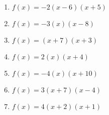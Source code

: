 \documentclass{article}%
\begin{document}
\begin{enumerate}[label=\alph*)]
\item%
\newline\vspace{0.5cm} $f(x)=-2(x-6)(x+5)$%
\item%
\newline\vspace{0.5cm} $f(x)=-3(x)(x-8)$%
\item%
\newline\vspace{0.5cm} $f(x)=(x+7)(x+3)$%
\item%
\newline\vspace{0.5cm} $f(x)=2(x)(x+4)$%
\item%
\newline\vspace{0.5cm} $f(x)=-4(x)(x+10)$%
\item%
\newline\vspace{0.5cm} $f(x)=3(x+7)(x-4)$%
\item%
\newline\vspace{0.5cm} $f(x)=4(x+2)(x+1)$%
\end{enumerate}

%
\end{document}
